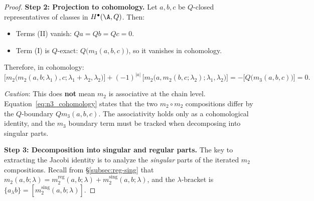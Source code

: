 \begin{proof}
\medskip
\textbf{Step 2: Projection to cohomology.}
Let $a,b,c$ be $Q$-closed representatives of classes in $H^\bullet(\A,Q)$. Then:
\begin{itemize}
\item Terms (II) vanish: $Qa = Qb = Qc = 0$.
\item Term (I) is $Q$-exact: $Q\bigl(m_3(a,b,c)\bigr)$, so it vanishes in cohomology.
\end{itemize}
Therefore, in cohomology:
\begin{equation}
\bigl[m_2\!\bigl(m_2(a,b;\lambda_1),c;\lambda_1{+}\lambda_2,\lambda_2\bigr)\bigr]
+ (-1)^{|a|}\,\bigl[m_2\!\bigl(a,m_2(b,c;\lambda_2);\lambda_1,\lambda_2\bigr)\bigr]
= -\bigl[Q\bigl(m_3(a,b,c)\bigr)\bigr] = 0.
\end{equation}

\emph{Caution}: This does \textbf{not} mean $m_2$ is associative at the
chain level. Equation~\eqref{eq:n3_cohomology} states that the two
$m_2 \circ m_2$ compositions differ by the $Q$-boundary
$Qm_3(a,b,c)$. The associativity holds only as a cohomological
identity, and the $m_3$ boundary term must be tracked when decomposing
into singular parts.

\medskip
\textbf{Step 3: Decomposition into singular and regular parts.}
The key to extracting the Jacobi identity is to analyze the \emph{singular} parts of the iterated $m_2$ compositions. Recall from \S\ref{subsec:reg-sing} that $m_2(a,b;\lambda) = m_2^{\mathrm{reg}}(a,b;\lambda) + m_2^{\mathrm{sing}}(a,b;\lambda)$, and the $\lambda$-bracket is $\{a_\lambda b\} = [m_2^{\mathrm{sing}}(a,b;\lambda)]$.


\end{proof}
